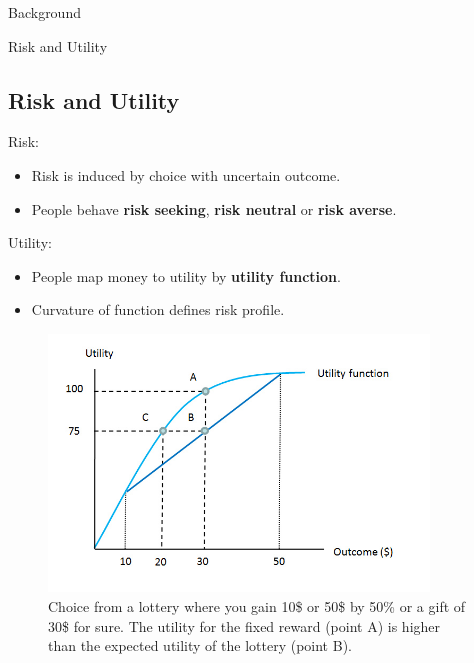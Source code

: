 \begin{exampleblock}{Background}

\begin{block}{Risk and Utility}
\subsection{Risk and Utility}

Risk: 
\begin{itemize}
    \item Risk is induced by choice with uncertain outcome.
    \item People behave \textbf{risk seeking}, \textbf{risk neutral} or \textbf{risk averse}.
\end{itemize}

 Utility:
\begin{itemize}
    \item People map money to utility by \textbf{utility function}.
    \item Curvature of function defines risk profile.
\end{itemize}


\begin{figure}
  \centering
    \includegraphics[width=0.9\textwidth]{img/background/riskaversion.jpg}
  \caption{Choice from a lottery where you gain 10\$ or 50\$ by 50\% or a gift of 30\$ for sure. The utility for the fixed reward (point A) is higher than the expected utility of the lottery (point B).}
  
\end{figure}


\end{block}
\end{exampleblock}
